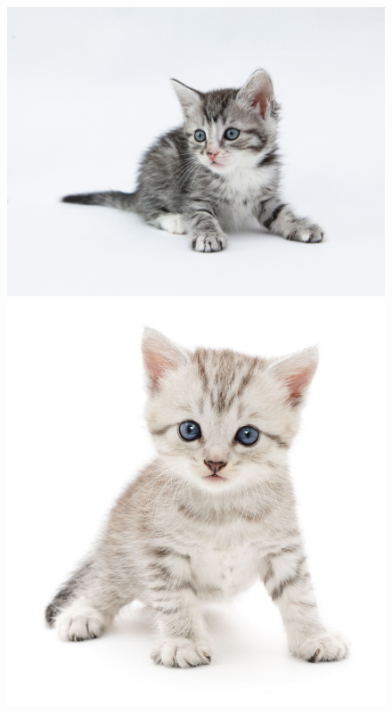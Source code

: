 \documentclass[12pt]{article}
\begin{document}
\newpage



\begin{figure}[ht]
\centering
\includegraphics[width=1\textwidth]{./kitten2.jpg}
\begin{minipage}[b]{0.49\linewidth}
 \includegraphics[width=1\textwidth]{./kitten3.jpg}
\end{minipage}

\end{figure}
\end{document}
